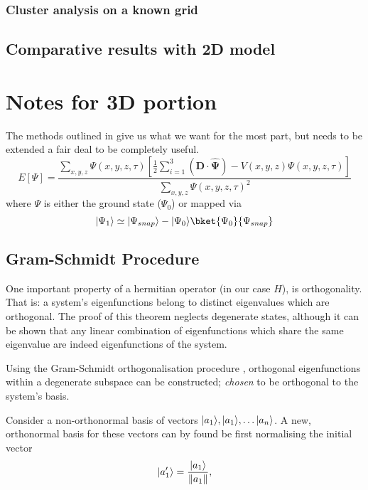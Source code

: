 \subsubsection{Cluster analysis on a known grid}
\subsection{Comparative results with 2D model}

\section{Notes for 3D portion}
The methods outlined in \cite{Strickland2010} give us what we want for the most part, but needs to be extended a fair deal to be completely useful.
\begin{equation}
E[\Psi] = \frac{\sum_{x,y,z}\Psi(x,y,z,\tau)\left[\frac{1}{2}\sum_{i=1}^3\left(\mathbf{D\cdot\widehat{\Psi}}\right)-V(x,y,z)\Psi(x,y,z,\tau)\right]}{\sum_{x,y,z}\Psi(x,y,z,\tau)^2}
\end{equation}
where $\Psi$ is either the ground state ($\Psi_0$) or mapped via
\begin{equation}
 \ket{\Psi_1} \simeq \ket{\Psi_{snap}} - \ket{\Psi_0}\bket{\Psi_0}{\Psi_{snap}}
\end{equation}

\subsection{Gram-Schmidt Procedure}\label{subsec:gsp}

One important property of a hermitian operator (in our case $H$), is orthogonality. That is: a system's eigenfunctions belong to distinct eigenvalues which are orthogonal.
The proof of this theorem neglects degenerate states, although it can be shown that any linear combination of eigenfunctions which share the same eigenvalue are indeed eigenfunctions of the system.

Using the Gram-Schmidt orthogonalisation procedure \cite{Gram1883, Schmidt1907}, orthogonal eigenfunctions within a degenerate subspace can be constructed; \textit{chosen} to be orthogonal to the system's basis.

Consider a non-orthonormal basis of vectors $\lvert a_1\rangle, \lvert a_1\rangle, \ldots \lvert a_n\rangle$.
A new, orthonormal basis for these vectors can by found be first normalising the initial vector
\begin{equation}
\lvert a^\prime_1\rangle = \frac{\lvert a_1\rangle}{\lVert a_1\rVert},
\end{equation}

